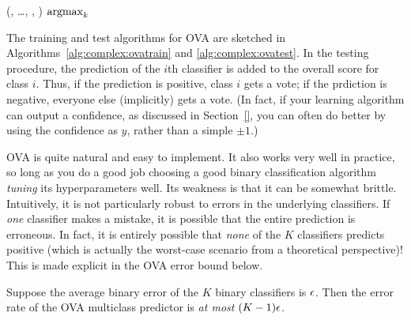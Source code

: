   {(, \dots, , \VAR{$\hat\vx$})}
  {
\ENDFOR
\RETURN $\argmax_k$ 
}

The training and test algorithms for OVA are sketched in
Algorithms~\ref{alg:complex:ovatrain} and \ref{alg:complex:ovatest}.
In the testing procedure, the prediction of the $i$th classifier is
added to the overall score for class $i$.  Thus, if the prediction is
positive, class $i$ gets a vote; if the prdiction is negative,
everyone else (implicitly) gets a vote.  (In fact, if your learning
algorithm can output a confidence, as discussed in Section~\ref{}, you
can often do better by using the confidence as $y$, rather than a
simple $\pm1$.)


OVA is quite natural and easy to implement.  It also
works very well in practice, so long as you do a good job choosing a
good binary classification algorithm \emph{tuning} its hyperparameters
well.  Its weakness is that it can be somewhat brittle.  Intuitively,
it is not particularly robust to errors in the underlying classifiers.
If \emph{one} classifier makes a mistake, it is possible that the
entire prediction is erroneous.  In fact, it is entirely possible that
\emph{none} of the $K$ classifiers predicts positive (which is
actually the worst-case scenario from a theoretical perspective)!
This is made explicit in the OVA error bound below.

\begin{theorem} \label{thm:complex:ova} Suppose the
  average binary error of the $K$ binary classifiers is $\epsilon$.  Then
  the error rate of the OVA multiclass predictor is \emph{at most}
  $(K-1) \epsilon$.
\end{theorem}

